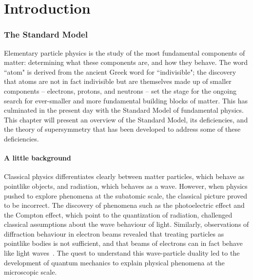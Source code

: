\chapter{Introduction\label{sec:intro}}



\subsection{The Standard Model\label{sec:SM}}

Elementary particle physics is the study of the most fundamental components of matter: determining what these components are, and how they behave. The word ``atom" is derived from the ancient Greek word for ``indivisible"; the discovery that atoms are not in fact indivisible but are themselves made up of smaller components -- electrons, protons, and neutrons -- set the stage for the ongoing search for ever-smaller and more fundamental building blocks of matter. This has culminated in the present day with the Standard Model of fundamental physics. This chapter will present an overview of the Standard Model, its deficiencies, and the theory of supersymmetry that has been developed to address some of these deficiencies.

\subsubsection{A little background\label{sec:SM-history}}

Classical physics differentiates clearly between matter particles, which behave as pointlike objects, and radiation, which behaves as a wave. However, when physics pushed to explore phenomena at the subatomic scale, the classical picture proved to be incorrect. The discovery of phenomena such as the photoelectric effect and the Compton effect, which point to the quantization of radiation, challenged classical assumptions about the wave behaviour of light. Similarly, observations of diffraction behaviour in electron beams revealed that treating particles as pointlike bodies is not sufficient, and that beams of electrons can in fact behave like light waves~\cite{MessiahPhysics}. The quest to understand this wave-particle duality led to the development of quantum mechanics to explain physical phenomena at the microscopic scale.

